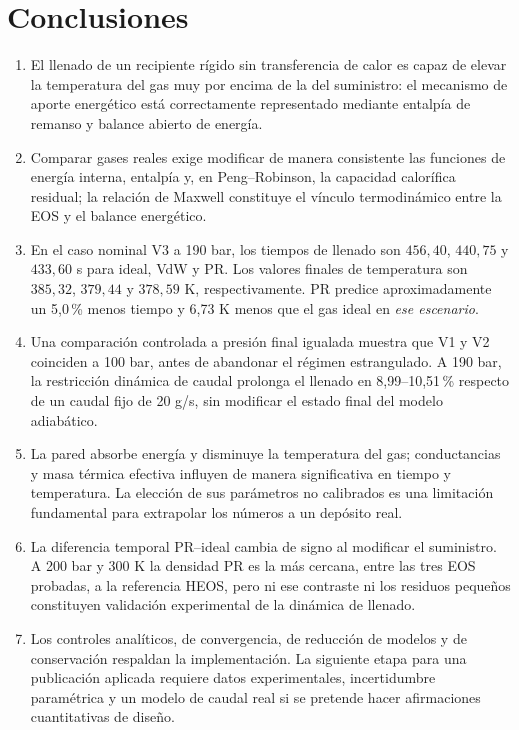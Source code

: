 \documentclass[11pt,letterpaper]{article}
\begin{document}
\section{Conclusiones}
\begin{enumerate}
\item El llenado de un recipiente rígido sin transferencia de calor es capaz de elevar la temperatura del gas muy por encima de la del suministro: el mecanismo de aporte energético está correctamente representado mediante entalpía de remanso y balance abierto de energía.
\item Comparar gases reales exige modificar de manera consistente las funciones de energía interna, entalpía y, en Peng--Robinson, la capacidad calorífica residual; la relación de Maxwell constituye el vínculo termodinámico entre la EOS y el balance energético.
\item En el caso nominal V3 a 190 bar, los tiempos de llenado son $456,40$, $440,75$ y $433,60$ s para ideal, VdW y PR. Los valores finales de temperatura son $385,32$, $379,44$ y $378,59$ K, respectivamente. PR predice aproximadamente un 5,0\,\% menos tiempo y 6,73 K menos que el gas ideal en \emph{ese escenario}.
\item Una comparación controlada a presión final igualada muestra que V1 y V2 coinciden a 100 bar, antes de abandonar el régimen estrangulado. A 190 bar, la restricción dinámica de caudal prolonga el llenado en 8,99--10,51\,\% respecto de un caudal fijo de 20 g/s, sin modificar el estado final del modelo adiabático.
\item La pared absorbe energía y disminuye la temperatura del gas; conductancias y masa térmica efectiva influyen de manera significativa en tiempo y temperatura. La elección de sus parámetros no calibrados es una limitación fundamental para extrapolar los números a un depósito real.
\item La diferencia temporal PR--ideal cambia de signo al modificar el suministro. A 200 bar y 300 K la densidad PR es la más cercana, entre las tres EOS probadas, a la referencia HEOS, pero ni ese contraste ni los residuos pequeños constituyen validación experimental de la dinámica de llenado.
\item Los controles analíticos, de convergencia, de reducción de modelos y de conservación respaldan la implementación. La siguiente etapa para una publicación aplicada requiere datos experimentales, incertidumbre paramétrica y un modelo de caudal real si se pretende hacer afirmaciones cuantitativas de diseño.
\end{enumerate}
\end{document}
